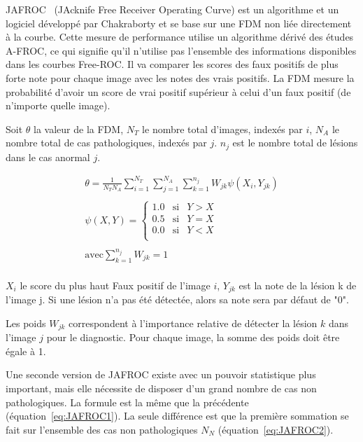 JAFROC~\cite{chakraborty2004observer} (JAcknife Free Receiver Operating Curve) est un algorithme et un logiciel développé par Chakraborty et se base sur une FDM non liée directement à la courbe. Cette mesure de performance utilise un algorithme dérivé des études A-FROC, ce qui signifie qu'il n'utilise pas l'ensemble des informations disponibles dans les courbes Free-ROC. Il va comparer les scores des faux positifs de plus forte note pour chaque image avec les notes des vrais positifs. La FDM mesure la probabilité d'avoir un score de vrai positif supérieur à celui d'un faux positif (de n'importe quelle image).

Soit $\theta$ la valeur de la FDM, $N_T$ le nombre total d'images, indexés par $i$, $N_A$ le nombre total de cas pathologiques, indexés par $j$. $n_j$ est le nombre total de lésions dans le cas anormal $j$.

\begin{equation}
\label{eq:JAFROC1}
\begin{array}{l}
	\displaystyle \theta=\frac{1}{N_T N_A} \sum_{i=1}^{N_T} \sum_{j=1}^{N_A} \sum_{k=1}^{n_j} W_{jk} \psi(X_i, Y_{jk}) \\
	\\
	\displaystyle \psi(X,Y) = \left\{
		\begin{array}{lll}
			1.0 & \mbox{si} & Y > X \\
			0.5 & \mbox{si} & Y = X    \\
			0.0 & \mbox{si} & Y < X    \\
		\end{array}
	\right. \\
	\\
	\displaystyle \mbox{avec} \sum_{k=1}^{n_j} W_{jk} = 1 \\
\end{array}
\end{equation}

$X_i$ le score du plus haut Faux positif de l'image $i$, $Y_{jk}$ est la note de la lésion k de l'image j. Si une lésion n'a pas été détectée, alors sa note sera par défaut de "0".

Les poids $W_{jk}$ correspondent à l'importance relative de détecter la lésion $k$ dans l'image $j$ pour le diagnostic. Pour chaque image, la somme des poids doit être égale à 1.

Une seconde version de JAFROC existe avec un pouvoir statistique plus important, mais elle nécessite de disposer d'un grand nombre de cas non pathologiques. La formule est la même que la précédente (équation~\ref{eq:JAFROC1}). La seule différence est que la première sommation se fait sur l'ensemble des cas non pathologiques $N_N$ (équation~\ref{eq:JAFROC2}).


